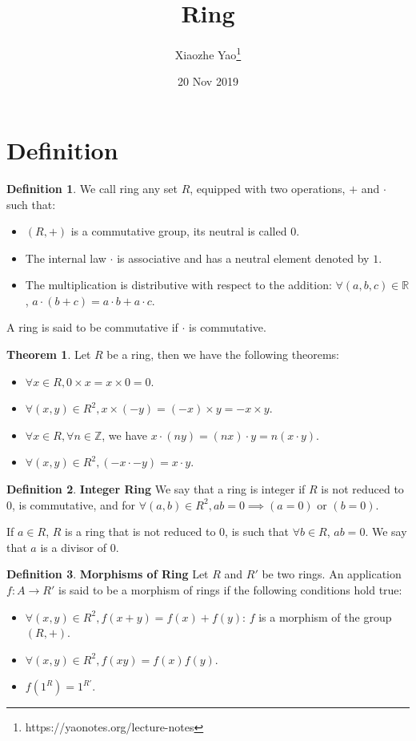 \documentclass{article}
\title{Ring}
\author{Xiaozhe Yao\footnote{https://yaonotes.org/lecture-notes}}
\date{20 Nov 2019}
\theoremstyle{definition}
\newtheorem{defi}{Definition}[subsection]
\newtheorem{theorem}{Theorem}[subsection]
\begin{document}
\maketitle

\section{Definition}
\begin{defi}
We call ring any set $R$, equipped with two operations, $+$ and $\cdot$ such that: \begin{itemize}
    \item $(R,+)$ is a commutative group, its neutral is called $0$.
    \item The internal law $\cdot$ is associative and has a neutral element denoted by $1$.
    \item The multiplication is distributive with respect to the addition: $\forall (a,b,c)\in \mathbb{R}$, $a\cdot (b+c)=a\cdot b + a \cdot c$.
\end{itemize}
A ring is said to be commutative if $\cdot$ is commutative.
\end{defi}

\begin{theorem}
Let $R$ be a ring, then we have the following theorems:\begin{itemize}
    \item $\forall x\in R, 0\times x = x \times 0 = 0$.
    \item $\forall (x,y)\in R^{2}, x\times (-y) = (-x)\times y = -x \times y$.
    \item $\forall x\in R, \forall n\in \mathbb{Z}$, we have $x\cdot(ny)=(nx)\cdot y = n(x\cdot y)$.
    \item $\forall (x,y)\in R^{2}, (-x\cdot -y) = x \cdot y$.
\end{itemize}
\end{theorem}
\begin{defi}
\textbf{Integer Ring} We say that a ring is integer if $R$ is not reduced to ${0}$, is commutative, and for $\forall (a,b)\in R^{2}, ab=0\implies (a=0)$ or $(b=0)$.

If $a\in R$, $R$ is a ring that is not reduced to 0, is such that $\forall b\in R$, $ab=0$. We say that $a$ is a divisor of 0.
\end{defi}

\begin{defi}
\textbf{Morphisms of Ring} Let $R$ and $R'$ be two rings. An application $f: A\to R'$ is said to be a morphism of rings if the following conditions hold true:
\begin{itemize}
    \item $\forall (x,y)\in R^{2}, f(x+y)=f(x)+f(y)$: $f$ is a morphism of the group $(R,+)$.
    \item $\forall(x,y)\in R^{2}, f(xy)=f(x)f(y)$.
    \item $f(1^{R})=1^{R'}$.
\end{itemize}
\end{defi}
\end{document}
